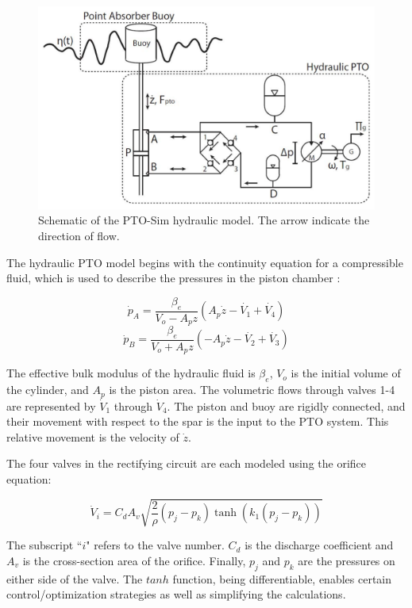 \documentclass[twocolumn,10pt]{asme2e}
\begin{document}
\begin{figure}[t]
    \centering
    \includegraphics[width=1\columnwidth]{Images/HydraulicPTO}
    \caption{Schematic of the PTO-Sim hydraulic model. The arrow indicate the direction of flow.}
    \label{HydPTO}
    \end{figure}

The hydraulic PTO model begins with the continuity equation for a compressible fluid, which is used to describe the pressures in the piston chamber \cite{merritthydraulic}:

\begin{equation}
\dot{p}_A=\frac{\beta_e}{V_o-A_pz}(A_p\dot{z}-\dot{V_1}+\dot{V_4}) 
\end{equation}
\begin{equation}
\dot{p}_B=\frac{\beta_e}{V_o+A_pz}(-A_p\dot{z}-\dot{V_2}+\dot{V_3}) 
\end{equation}

The effective bulk modulus of the hydraulic fluid is $\beta_e$, $V_o$ is the initial volume of the cylinder, and $A_p$ is the piston area. The volumetric flows through valves 1-4 are represented by $\dot{V}_1$ through $\dot{V}_4$. The piston and buoy are rigidly connected, and their movement with respect to the spar is the input to the 
PTO system. This relative movement is the velocity of $\dot{z}$.

The four valves in the rectifying circuit are each modeled using the orifice equation: 

\begin{equation}
\dot{V}_i=C_dA_v \sqrt{\frac{2}{\rho}(p_j-p_k)\tanh(k_1(p_j-p_k))}  
\end{equation}

The subscript ``$i$" refers to the valve number. $C_d$ is the discharge coefficient and $A_v$ is the cross-section area of the orifice. Finally, $p_j$ and $p_k$ are the pressures on either side of the valve. The $tanh$ function, being differentiable, enables certain  control/optimization strategies as well as simplifying
the calculations. 
\end{document}
